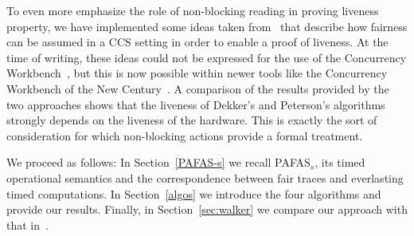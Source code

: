 \documentclass[copyright,creativecommons]{eptcs}
\begin{document}
To even more emphasize the role of non-blocking reading in proving
liveness property, we have implemented some ideas taken
from~\cite{Walker89}
that describe how fairness can be assumed in a CCS setting in order to
enable a proof of liveness. At the time of writing, these ideas could not
be expressed for the use of the Concurrency
Workbench~\cite{CleavelandPS89}, but this is now possible within newer
tools like the Concurrency Workbench of the New Century~\cite{CLS00}. A
comparison of the results provided by the two approaches shows that the
liveness of Dekker's and Peterson's algorithms strongly depends on the
liveness of the hardware. This is exactly the sort of consideration for
which non-blocking actions provide a formal treatment.

We proceed as follows: In Section~\ref{PAFAS-s} we recall PAFAS$_s$, its
timed operational semantics and the correspondence between fair traces and
everlasting timed computations. In Section~\ref{algos} we introduce the
four algorithms and provide our results. Finally, in
Section~\ref{sec:walker} we compare our approach with that
in~\cite{Walker89}.
\end{document}
